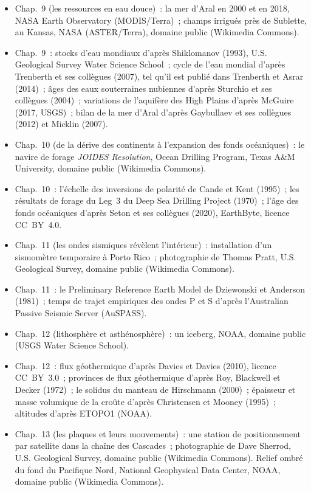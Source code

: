 \begin{itemize}
  \item Chap.~9 (les ressources en eau douce)~: la mer d'Aral en 2000 et en 2018, NASA Earth Observatory (MODIS/Terra)~; champs irrigués près de Sublette, au Kansas, NASA (ASTER/Terra), domaine public (Wikimedia Commons).
  \item Chap.~9~: stocks d'eau mondiaux d'après Shiklomanov (1993), U.S. Geological Survey Water Science School~; cycle de l'eau mondial d'après Trenberth et ses collègues (2007), tel qu'il est publié dans Trenberth et Asrar (2014)~; âges des eaux souterraines nubiennes d'après Sturchio et ses collègues (2004)~; variations de l'aquifère des High Plains d'après McGuire (2017, USGS)~; bilan de la mer d'Aral d'après Gaybullaev et ses collègues (2012) et Micklin (2007).
  \item Chap.~10 (de la dérive des continents à l'expansion des fonds océaniques)~: le navire de forage \emph{JOIDES Resolution}, Ocean Drilling Program, Texas A\&M University, domaine public (Wikimedia Commons).
  \item Chap.~10~: l'échelle des inversions de polarité de Cande et Kent (1995)~; les résultats de forage du Leg~3 du Deep Sea Drilling Project (1970)~; l'âge des fonds océaniques d'après Seton et ses collègues (2020), EarthByte, licence CC~BY~4.0.
  \item Chap.~11 (les ondes sismiques révèlent l'intérieur)~: installation d'un sismomètre temporaire à Porto Rico~; photographie de Thomas Pratt, U.S. Geological Survey, domaine public (Wikimedia Commons).
  \item Chap.~11~: le Preliminary Reference Earth Model de Dziewonski et Anderson (1981)~; temps de trajet empiriques des ondes P et S d'après l'Australian Passive Seismic Server (AuSPASS).
  \item Chap.~12 (lithosphère et asthénosphère)~: un iceberg, NOAA, domaine public (USGS Water Science School).
  \item Chap.~12~: flux géothermique d'après Davies et Davies (2010), licence CC~BY~3.0~; provinces de flux géothermique d'après Roy, Blackwell et Decker (1972)~; le solidus du manteau de Hirschmann (2000)~; épaisseur et masse volumique de la croûte d'après Christensen et Mooney (1995)~; altitudes d'après ETOPO1 (NOAA).
  \item Chap.~13 (les plaques et leurs mouvements)~: une station de positionnement par satellite dans la chaîne des Cascades~; photographie de Dave Sherrod, U.S. Geological Survey, domaine public (Wikimedia Commons). Relief ombré du fond du Pacifique Nord, National Geophysical Data Center, NOAA, domaine public (Wikimedia Commons).

\end{itemize}
